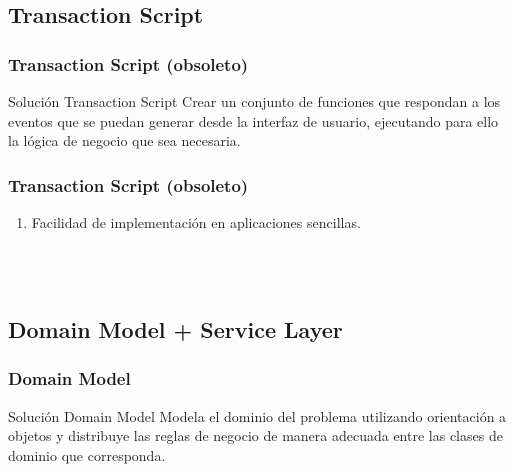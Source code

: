 \documentclass[a4paper,slidestop,xcolor=pst,dvips,blue]{beamer}
\begin{document}
\subsection{Transaction Script}

\begin{frame}[c]
    \frametitle{Transaction Script (obsoleto)}
    \begin{block}{Solución Transaction Script}
        Crear un conjunto de funciones que respondan a los eventos que se puedan generar
        desde la interfaz de usuario, ejecutando para ello la lógica de negocio que sea necesaria.
    \end{block}
\end{frame}

\begin{frame}[c]
    \frametitle{Transaction Script (obsoleto)}
    \begin{enumerate}
        \item<2-> Facilidad de implementación en aplicaciones sencillas.
    \end{enumerate}
    \ \\ \ \\
\end{frame}

\subsection{Domain Model + Service Layer}

\begin{frame}[c]
    \frametitle{Domain Model}
    \begin{block}{Solución Domain Model}
        Modela el dominio del problema utilizando orientación a objetos y distribuye las reglas de negocio de manera adecuada entre las clases de dominio que corresponda.
    \end{block}
\end{frame}
\end{document}

